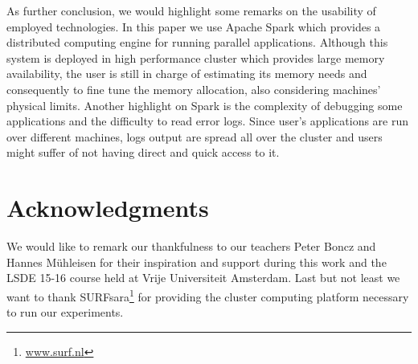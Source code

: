 \documentclass{vldb}
\begin{document}
As further conclusion, we would highlight some remarks on the usability of employed technologies.
In this paper we use Apache Spark which provides a distributed computing engine for running parallel applications.
Although this system is deployed in high performance cluster which provides large memory availability, the user is still in charge of estimating its memory needs and consequently to fine tune the memory allocation, also considering machines' physical limits.
Another highlight on Spark is the complexity of debugging some applications and the difficulty to read error logs.
Since user's applications are run over different machines, logs output are spread all over the cluster and users might suffer of not having direct and quick access to it.
 

\section{Acknowledgments}
We would like to remark our thankfulness to our teachers Peter Boncz and Hannes M{\"u}hleisen for their inspiration and support during this work and the LSDE 15-16 course held at Vrije Universiteit Amsterdam.
Last but not least we want to thank SURFsara\footnote{\url{www.surf.nl}} for providing the cluster computing platform necessary to run our experiments.


 
\end{document}
